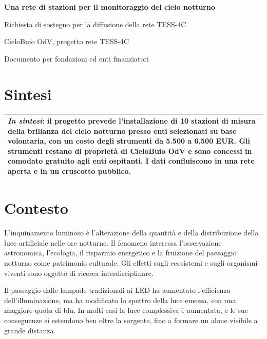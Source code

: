 \documentclass[11pt,a4paper]{report}
\newcommand{\infobox}[1]{%

  \begin{center}

  \renewcommand{\arraystretch}{1.5}

  \begin{tabularx}{\linewidth}{X}
    \arrayrulecolor{linegray}
    \toprule
    #1 \\
    \bottomrule
  \end{tabularx}

  \end{center}

}
\begin{document}
\begin{center}

{\LARGE\bfseries\color{nightblue} Una rete di stazioni per il monitoraggio del cielo notturno\par}

\vspace{0.2cm}

{\large Richiesta di sostegno per la diffusione della rete TESS-4C\par}

\vspace{0.1cm}

{\small CieloBuio OdV, progetto rete TESS-4C\par}

{\small Documento per fondazioni ed enti finanziatori}

\end{center}

\section*{Sintesi}

\infobox{%
\textit{In sintesi}: il progetto prevede l'installazione di 10 stazioni di misura della brillanza del cielo notturno presso enti selezionati su base volontaria, con un costo degli strumenti da 5.500 a 6.500 EUR. Gli strumenti restano di proprietà di CieloBuio OdV e sono concessi in comodato gratuito agli enti ospitanti. I dati confluiscono in una rete aperta e in un cruscotto pubblico.
}

\section*{Contesto}

L'inquinamento luminoso è l'alterazione della quantità e della distribuzione della luce artificiale nelle ore notturne. Il fenomeno interessa l'osservazione astronomica, l'ecologia, il risparmio energetico e la fruizione del paesaggio notturno come patrimonio culturale. Gli effetti sugli ecosistemi e sugli organismi viventi sono oggetto di ricerca interdisciplinare.

Il passaggio dalle lampade tradizionali ai LED ha aumentato l'efficienza dell'illuminazione, ma ha modificato lo spettro della luce emessa, con una maggiore quota di blu. In molti casi la luce complessiva è aumentata, e le sue conseguenze si estendono ben oltre la sorgente, fino a formare un alone visibile a grande distanza.
\end{document}
